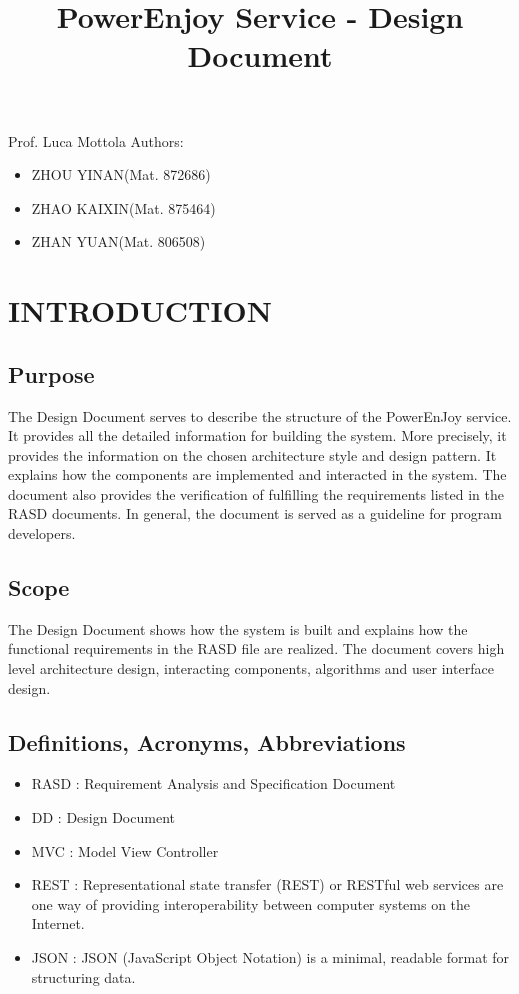 \documentclass{article}
\title{PowerEnjoy Service - Design Document}
\begin{document}
\begin{titlepage}
\begin{figure}
	\centering
\end{figure}
\maketitle
\centering
Prof. Luca Mottola
\newline
\raggedleft
Authors:
\begin{itemize}
	\raggedleft
	\item ZHOU YINAN(Mat. 872686)
	\item ZHAO KAIXIN(Mat. 875464)
	\item ZHAN YUAN(Mat. 806508)	
\end{itemize}
\end{titlepage}

\tableofcontents
\newpage

	
	\section{INTRODUCTION}
	\subsection{Purpose}
	The Design Document serves to describe the structure of the PowerEnJoy service. It provides all the detailed information for building the system. More precisely, it provides the information on the chosen architecture style and design pattern. It explains how the components are implemented and interacted in the system. The document also provides the verification of fulfilling the requirements listed in the RASD documents. In general, the document is served as a guideline for program developers.
	\subsection{Scope}
	The Design Document shows how the system is built and explains how the functional requirements in the RASD file are realized. The document covers high level architecture design, interacting components,  algorithms and user interface design. 
	\subsection{Definitions, Acronyms, Abbreviations}
	\begin{itemize}
		\item RASD : Requirement Analysis and Specification Document
		\item DD : Design Document
		\item MVC : Model View Controller
		\item REST : Representational state transfer (REST) or RESTful web services are one way of providing interoperability between computer systems on the Internet.
		\item JSON : JSON (JavaScript Object Notation) is a minimal, readable format for structuring data. 
	\end{itemize}
\end{document}
